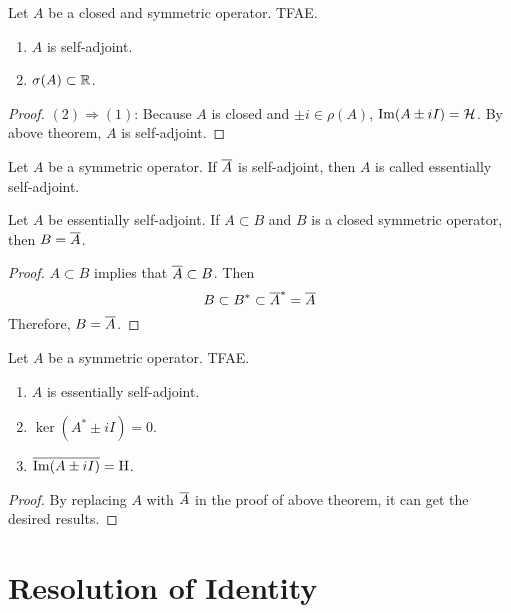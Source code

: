 \documentclass[a4paper,12pt]{article}
\begin{document}
\begin{prop}
    Let $A$ be a closed and symmetric operator. TFAE.
    \begin{enumerate}[label=(\arabic{*})]
        \item $A$ is self-adjoint.
        \item $\sigma(A) \subset \mathbb{R}$.
    \end{enumerate}
\end{prop}
\begin{proof}
    $(2) \Rightarrow (1)$: Because $A$ is closed and $\pm i \in \rho(A)$, $\operatorname{Im} (A \pm iI) = \mathcal{H}$. By above theorem, $A$ is self-adjoint.
\end{proof}

\begin{defn}
    Let $A$ be a symmetric operator. If $\overline{A}$ is self-adjoint, then $A$ is called essentially self-adjoint.
\end{defn}

\begin{prop}
    Let $A$ be essentially self-adjoint. If $A \subset B$ and $B$ is a closed symmetric operator, then $B = \overline{A}$.
\end{prop}
\begin{proof}
    $A \subset B$ implies that $\overline{A} \subset B$. Then
    \begin{equation*}
        B \subset B^* \subset \overline{A}^* = \overline{A}
    \end{equation*}
    Therefore, $B = \overline{A}$.
\end{proof}

\begin{prop}
    Let $A$ be a symmetric operator. TFAE.
    \begin{enumerate}[label=(\arabic{*})]
        \item $A$ is essentially self-adjoint.
        \item $\ker (A^* \pm iI) = 0$.
        \item $\overline{\operatorname{Im} (A \pm iI)} = \mathrm{H}$.
    \end{enumerate}
\end{prop}
\begin{proof}
    By replacing $A$ with $\overline{A}$ in the proof of above theorem, it can get the desired results.
\end{proof}

\section{Resolution of Identity}
\end{document}

